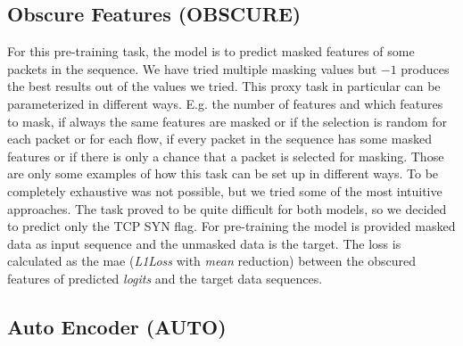 \subsection{Obscure Features (OBSCURE)} \label{sec:experiments:lstm:obscure}

For this pre-training task, the model is to predict masked features of some packets in the sequence. We have tried multiple masking values but $-1$ produces the best results out of the values we tried. This proxy task in particular can be parameterized in different ways. E.g. the number of features and which features to mask, if always the same features are masked or if the selection is random for each packet or for each flow, if every packet in the sequence has some masked features or if there is only a chance that a packet is selected for masking. Those are only some examples of how this task can be set up in different ways. To be completely exhaustive was not possible, but we tried some of the most intuitive approaches. The task proved to be quite difficult for both models, so we decided to predict only the TCP SYN flag. For pre-training the model is provided masked data as input sequence and the unmasked data is the target. The loss is calculated as the \gls{mae} (\textit{L1Loss} with \textit{mean} reduction) between the obscured features of predicted \textit{logits} and the target data sequences.

\subsection{Auto Encoder (AUTO)} \label{sec:experiments:lstm:auto_encoder}

